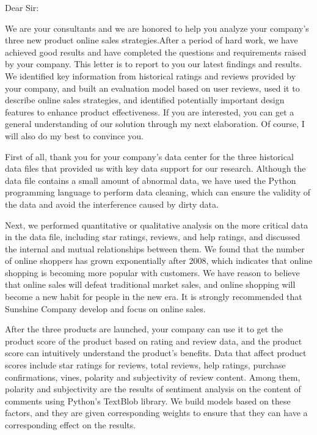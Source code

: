 \documentclass{mcmthesis}
\begin{document}

\newpage
{}
\memodate{\today}

\begin{memo}[Letter]
	Dear Sir:
	
	We are your consultants and we are honored to help you analyze your company's three new product online sales strategies.After a period of hard work, we have achieved good results and have completed the questions and requirements raised by your company. This letter is to report to you our latest findings and results. We identified key information from historical ratings and reviews provided by your company, and built an evaluation model based on user reviews, used it to describe online sales strategies, and identified potentially important design features to enhance product effectiveness. If you are interested, you can get a general understanding of our solution through my next elaboration. Of course, I will also do my best to convince you.
	
	First of all, thank you for your company's data center for the three historical data files that provided us with key data support for our research. Although the data file contains a small amount of abnormal data, we have used the Python programming language to perform data cleaning, which can ensure the validity of the data and avoid the interference caused by dirty data.
	
	Next, we performed quantitative or qualitative analysis on the more critical data in the data file, including star ratings, reviews, and help ratings, and discussed the internal and mutual relationships between them. We found that the number of online shoppers has grown exponentially after 2008, which indicates that online shopping is becoming more popular with customers. We have reason to believe that online sales will defeat traditional market sales, and online shopping will become a new habit for people in the new era. It is strongly recommended that Sunshine Company develop and focus on online sales.
	
	After the three products are launched, your company can use it to get the product score of the product based on rating and review data, and the product score can intuitively understand the product's benefits. Data that affect product scores include star ratings for reviews, total reviews, help ratings, purchase confirmations, vines, polarity and subjectivity of review content. Among them, polarity and subjectivity are the results of sentiment analysis on the content of comments using Python's TextBlob library. We build models based on these factors, and they are given corresponding weights to ensure that they can have a corresponding effect on the results.
	

\end{memo}
\end{document}
